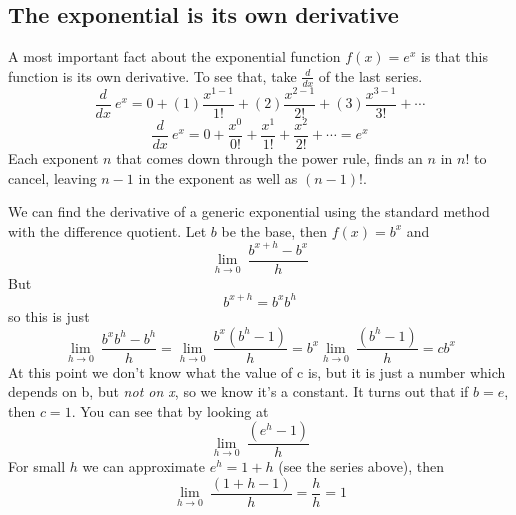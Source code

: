 \documentclass[11pt, oneside]{article}   	%
\begin{document}
\subsection*{The exponential is its own derivative}

A most important fact about the exponential function $f(x) = e^x$ is that this function is its own derivative.  To see that, take $\frac{d}{dx}$ of the last series.
\[ \frac{d}{dx} \ e^x = 0 + (1)\frac{x^{1-1}}{1!} + (2)\frac{x^{2-1}}{2!} + (3)\frac{x^{3-1}}{3!} + \cdots  \]
\[ \frac{d}{dx} \ e^x = 0 + \frac{x^{0}}{0!} + \frac{x^{1}}{1!} + \frac{x^{2}}{2!} + \cdots  = e^x \]
Each exponent $n$ that comes down through the power rule, finds an $n$ in $n!$ to cancel, leaving $n-1$ in the exponent as well as $(n-1)!$.

We can find the derivative of a generic exponential using the standard method with the difference quotient.  Let $b$ be the base, then $f(x) = b^x$ and
\[ \lim_{h \to 0}    \ \frac{b^{x+h} - b^x}{h}   \]
But
\[  b^{x+h} = b^x b^h  \]
so this is just
\[ \lim_{h \to 0}    \ \frac{b^xb^h - b^h}{h} = \lim_{h \to 0}    \ \frac{b^x(b^h - 1)}{h} = b^x  \lim_{h \to 0}\ \frac{(b^h - 1)}{h} = cb^x \]
At this point we don't know what the value of c is, but it is just a number which depends on b, but \emph{not on x}, so we know it's a constant.  It turns out that if $b = e$, then $c=1$.  You can see that by looking at
\[ \lim_{h \to 0}\ \frac{(e^h - 1)}{h} \]
For small $h$ we can approximate $e^h = 1 + h$ (see the series above), then
\[ \lim_{h \to 0}\ \frac{(1 + h - 1)}{h} = \frac{h}{h} = 1 \]
\end{document}
